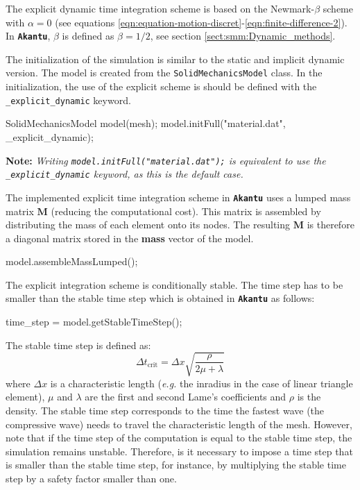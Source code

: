 \documentclass[a4paper,11pt]{book}
\newcommand{\akantu}{{\texttt{\textbf{Akantu}}}\xspace}
\newcommand{\code}[1]{\texttt{#1}}
\newcommand{\note}[1]{\textbf{Note: }\textit{#1}}
\newcommand{\mat}[1]{\ensuremath{\boldsymbol{#1}}}
\newcommand{\st}[1]{{\mathrm{#1}}}
\newcommand{\eg}{\emph{e.g.}\xspace}
\begin{document}
The explicit  dynamic time  integration scheme is  based on  the Newmark-$\beta$
scheme            with            $\alpha=0$           (see            equations
\ref{eqn:equation-motion-discret}-\ref{eqn:finite-difference-2}).   In  \akantu,
$\beta$ is defined as $\beta=1/2$, see section \ref{sect:smm:Dynamic_methods}.

The  initialization of  the simulation  is similar  to the  static  and implicit
dynamic  version.   The model  is  created  from the  \code{SolidMechanicsModel}
class.   In the  initialization, the  use of  the explicit  scheme is  should be
defined with the \code{\_explicit\_dynamic} keyword.

\begin{cpp}
  SolidMechanicsModel model(mesh);
  model.initFull("material.dat", _explicit_dynamic);
\end{cpp}

\note{Writing \code{model.initFull("material.dat");}  is equivalent to  use the
  \code{\_explicit\_dynamic} keyword, as this is the default case.}

The implemented explicit  time integration scheme in \akantu  uses a lumped mass
matrix $\mat{M}$ (reducing the computational  cost). This matrix is assembled by
distributing the mass of each element onto its nodes. The resulting $\mat{M}$ is
therefore a diagonal matrix stored in the \textbf{mass} vector of the model.


\begin{cpp}
  model.assembleMassLumped();
\end{cpp}

The explicit integration scheme is conditionally stable. The time step has to be
smaller than the stable time step which is obtained in \akantu as follows:

\begin{cpp}
  time_step = model.getStableTimeStep();
\end{cpp}

The stable time step is defined as:
\begin{equation}
  \Delta t_{\st{crit}} = \Delta x \sqrt{\frac{\rho}{2 \mu +\lambda}}
\end{equation}\label{eqn:smm:explicit:stabletime}
where $\Delta  x$ is a  characteristic length (\eg  the inradius in the  case of
linear triangle  element), $\mu$ and $\lambda$  are the first  and second Lame's
coefficients and $\rho$ is the density.  The stable time step corresponds to the
time the fastest wave (the  compressive wave) needs to travel the characteristic
length of the mesh.   However, note that if the time step  of the computation is
equal to the stable time step, the simulation remains unstable. Therefore, is it
necessary to impose a  time step that is smaller than the  stable time step, for
instance, by  multiplying the stable time  step by a safety  factor smaller than
one.
\end{document}
